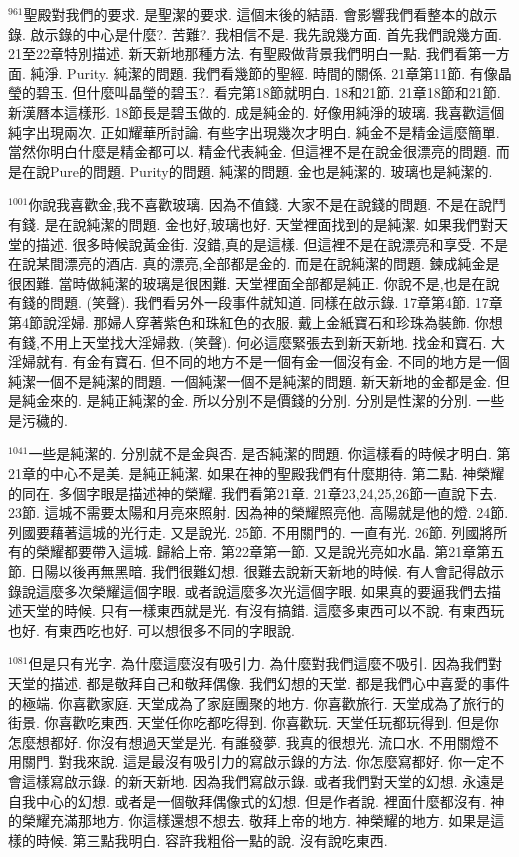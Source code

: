 \documentclass{book}
\begin{document}
$^{961}$聖殿對我們的要求.
是聖潔的要求.
這個末後的結語.
會影響我們看整本的啟示錄.
啟示錄的中心是什麼?.
苦難?.
我相信不是.
我先說幾方面.
首先我們說幾方面.
21至22章特別描述.
新天新地那種方法.
有聖殿做背景我們明白一點.
我們看第一方面.
純淨.
Purity.
純潔的問題.
我們看幾節的聖經.
時間的關係.
21章第11節.
有像晶瑩的碧玉.
但什麼叫晶瑩的碧玉?.
看完第18節就明白.
18和21節.
21章18節和21節.
新漢曆本這樣形.
18節長是碧玉做的.
成是純金的.
好像用純淨的玻璃.
我喜歡這個純字出現兩次.
正如耀華所討論.
有些字出現幾次才明白.
純金不是精金這麼簡單.
當然你明白什麼是精金都可以.
精金代表純金.
但這裡不是在說金很漂亮的問題.
而是在說Pure的問題.
Purity的問題.
純潔的問題.
金也是純潔的.
玻璃也是純潔的.

$^{1001}$你說我喜歡金,我不喜歡玻璃.
因為不值錢.
大家不是在說錢的問題.
不是在說鬥有錢.
是在說純潔的問題.
金也好,玻璃也好.
天堂裡面找到的是純潔.
如果我們對天堂的描述.
很多時候說黃金街.
沒錯,真的是這樣.
但這裡不是在說漂亮和享受.
不是在說某間漂亮的酒店.
真的漂亮,全部都是金的.
而是在說純潔的問題.
鍊成純金是很困難.
當時做純潔的玻璃是很困難.
天堂裡面全部都是純正.
你說不是,也是在說有錢的問題.
(笑聲).
我們看另外一段事件就知道.
同樣在啟示錄.
17章第4節.
17章第4節說淫婦.
那婦人穿著紫色和珠紅色的衣服.
戴上金紙寶石和珍珠為裝飾.
你想有錢,不用上天堂找大淫婦救.
(笑聲).
何必這麼緊張去到新天新地.
找金和寶石.
大淫婦就有.
有金有寶石.
但不同的地方不是一個有金一個沒有金.
不同的地方是一個純潔一個不是純潔的問題.
一個純潔一個不是純潔的問題.
新天新地的金都是金.
但是純金來的.
是純正純潔的金.
所以分別不是價錢的分別.
分別是性潔的分別.
一些是污穢的.

$^{1041}$一些是純潔的.
分別就不是金與否.
是否純潔的問題.
你這樣看的時候才明白.
第21章的中心不是美.
是純正純潔.
如果在神的聖殿我們有什麼期待.
第二點.
神榮耀的同在.
多個字眼是描述神的榮耀.
我們看第21章.
21章23,24,25,26節一直說下去.
23節.
這城不需要太陽和月亮來照射.
因為神的榮耀照亮他.
高陽就是他的燈.
24節.
列國要藉著這城的光行走.
又是說光.
25節.
不用關門的.
一直有光.
26節.
列國將所有的榮耀都要帶入這城.
歸給上帝.
第22章第一節.
又是說光亮如水晶.
第21章第五節.
日陽以後再無黑暗.
我們很難幻想.
很難去說新天新地的時候.
有人會記得啟示錄說這麼多次榮耀這個字眼.
或者說這麼多次光這個字眼.
如果真的要逼我們去描述天堂的時候.
只有一樣東西就是光.
有沒有搞錯.
這麼多東西可以不說.
有東西玩也好.
有東西吃也好.
可以想很多不同的字眼說.

$^{1081}$但是只有光字.
為什麼這麼沒有吸引力.
為什麼對我們這麼不吸引.
因為我們對天堂的描述.
都是敬拜自己和敬拜偶像.
我們幻想的天堂.
都是我們心中喜愛的事件的極端.
你喜歡家庭.
天堂成為了家庭團聚的地方.
你喜歡旅行.
天堂成為了旅行的街景.
你喜歡吃東西.
天堂任你吃都吃得到.
你喜歡玩.
天堂任玩都玩得到.
但是你怎麼想都好.
你沒有想過天堂是光.
有誰發夢.
我真的很想光.
流口水.
不用關燈不用關門.
對我來說.
這是最沒有吸引力的寫啟示錄的方法.
你怎麼寫都好.
你一定不會這樣寫啟示錄.
的新天新地.
因為我們寫啟示錄.
或者我們對天堂的幻想.
永遠是自我中心的幻想.
或者是一個敬拜偶像式的幻想.
但是作者說.
裡面什麼都沒有.
神的榮耀充滿那地方.
你這樣還想不想去.
敬拜上帝的地方.
神榮耀的地方.
如果是這樣的時候.
第三點我明白.
容許我粗俗一點的說.
沒有說吃東西.
\end{document}
